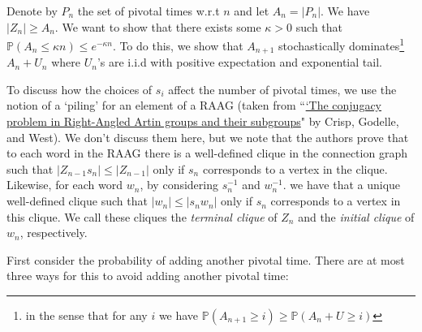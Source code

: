 \documentclass[12pt]{article}
\begin{document}
	  Denote by $ P _{n} $ the set of pivotal times w.r.t $ n $ and let $ A _{n} = |P _{n}| $. We have $ |Z _{n}| \geq A _{n} $. We want to show that there exists some $ \kappa > 0 $ such that $ \mathbb{P} (A _{n} \leq \kappa n) \leq e ^{-\kappa n} $. To do this, we show that $ A _{n+1} $ stochastically dominates\footnote{in the sense that for any $ i $ we have $ \mathbb{P} (A _{n+1} \geq i) \geq \mathbb{P} (A _{n} + U \geq i)$} $ A _{n} + U _{n} $ where $ U _{n} $'s are i.i.d with positive expectation and exponential tail.

	  To discuss how the choices of $ s _{i} $ affect the number of pivotal times, we use the notion of a `piling' for an element of a RAAG (taken from ``\href{https://arxiv.org/pdf/0802.1771.pdf}{`The conjugacy problem in Right-Angled Artin groups and their subgroups}" by Crisp, Godelle, and West). We don't discuss them here, but we note that the authors prove that to each word in the RAAG there is a well-defined clique in the connection graph such that $ |Z _{n-1}s _{n}| \leq |Z _{n-1}|$ only if $ s _{n} $ corresponds to a vertex in the clique. Likewise, for each word $ w _{n} $, by considering $ s _{n} ^{-1} $ and $ w _{n} ^{-1} $. we have that a unique well-defined clique such that $ |w _{n}| \leq  |s _{n} w _{n}| $ only if $ s _{n} $ corresponds to a vertex in this clique. We call these cliques the \emph{terminal clique} of $ Z _{n} $ and the \emph{initial clique} of $ w _{n} $, respectively.




	  First consider the probability of adding another pivotal time. There are at most three ways for this to avoid adding another pivotal time:
\end{document}
